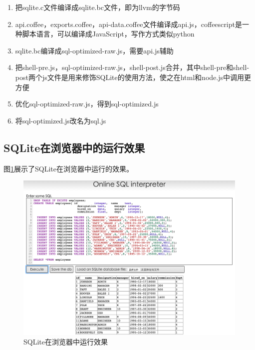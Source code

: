 \begin{enumerate}
    \item 把sqlite.c文件编译成sqlite.bc文件，即为llvm的字节码
    \item api.coffee，exports.coffee，api-data.coffee文件编译成api.js，coffeescript是一种脚本语言，可以编译成JavaScript，写作方式类似python
    \item sqlite.bc编译成sql-optimized-raw.js，需要api.js辅助
	\item 把shell-pre.js，sql-optimized-raw.js，shell-post.js合并，其中shell-pre和shell-post两个js文件是用来修饰SQLite的使用方法，使之在html和node.js中调用更方便
	\item 优化sql-optimized-raw.js，得到sql-optimized.js
	\item 将sql-optimized.js改名为sql.js
\end{enumerate}

\subsection{SQLite在浏览器中的运行效果}

图\ref{sqlite-html}展示了SQLite在浏览器中运行的效果。

\begin{figure}[h!] %
    \centering
    \includegraphics[width=450bp]{figure/pic/sqlite-sample-html.png}
    \caption{SQLite在浏览器中运行效果}
    \label{sqlite-html}
\end{figure}